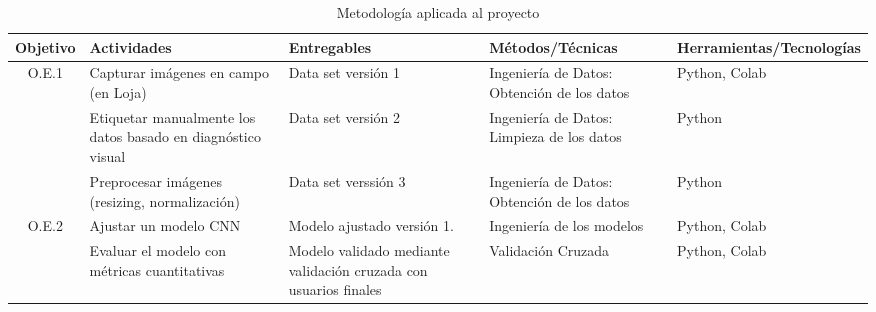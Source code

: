 \clearpage
\begin{landscape}
\begin{table}[h]
\centering
\caption{Metodología aplicada al proyecto}
\label{tab:alcance}
\begin{tabular}{|c|p{5cm}|p{5cm}|p{5cm}|p{5cm}|}
\hline
\textbf{Objetivo} & \textbf{Actividades } & \textbf{Entregables} & \textbf{Métodos/Técnicas}& \textbf{Herramientas/Tecnologías} \\ \hline


\multirow{3}{*}{O.E.1} 
& Capturar imágenes en campo (en Loja) 
& Data set versión 1 
& Ingeniería de Datos: Obtención de los datos & Python, Colab\\ \cline{2-5}

& Etiquetar manualmente los datos basado en diagnóstico visual 
& Data set versión 2
& Ingeniería de Datos: Limpieza de los datos & Python \\ \cline{2-5}

& Preprocesar imágenes (resizing, normalización) 
& Data set verssión 3 
& Ingeniería de Datos: Obtención de los datos & Python\\ \hline

\multirow{2}{*}{O.E.2} 
& Ajustar un modelo CNN 
& Modelo ajustado versión 1. 
& Ingeniería de los modelos& Python, Colab \\ \cline{2-5}

& Evaluar el modelo con métricas cuantitativas 
& Modelo validado mediante validación cruzada con usuarios finales 
& Validación Cruzada& Python, Colab\\ \hline
\end{tabular}
\end{table}
\end{landscape}


\clearpage


